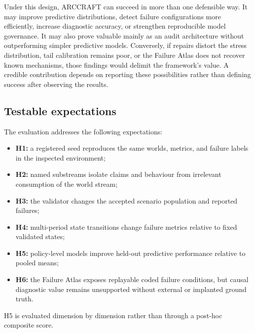 Under this design, ARCCRAFT can succeed in more than one defensible way. It may improve predictive distributions, detect failure configurations more efficiently, increase diagnostic accuracy, or strengthen reproducible model governance. It may also prove valuable mainly as an audit architecture without outperforming simpler predictive models. Conversely, if repairs distort the stress distribution, tail calibration remains poor, or the Failure Atlas does not recover known mechanisms, those findings would delimit the framework's value. A credible contribution depends on reporting these possibilities rather than defining success after observing the results.

\subsection{Testable expectations}\label{sec:testable-expectations}

The evaluation addresses the following expectations:

\begin{itemize}[leftmargin=*]
\item \textbf{H1:} a registered seed reproduces the same worlds, metrics, and failure labels in the inspected environment;
\item \textbf{H2:} named substreams isolate claims and behaviour from irrelevant consumption of the world stream;
\item \textbf{H3:} the validator changes the accepted scenario population and reported failures;
\item \textbf{H4:} multi-period state transitions change failure metrics relative to fixed validated states;
\item \textbf{H5:} policy-level models improve held-out predictive performance relative to pooled means;
\item \textbf{H6:} the Failure Atlas exposes replayable coded failure conditions, but causal diagnostic value remains unsupported without external or implanted ground truth.
\end{itemize}

H5 is evaluated dimension by dimension rather than through a post-hoc composite score.
